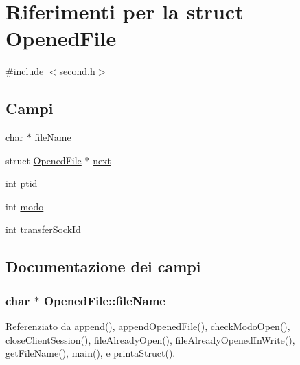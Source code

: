 \hypertarget{structOpenedFile}{}\section{Riferimenti per la struct Opened\+File}
\label{structOpenedFile}


{\ttfamily \#include $<$second.\+h$>$}

\subsection*{Campi}
\begin{DoxyCompactItemize}
\item 
char $\ast$ \hyperlink{structOpenedFile_abcff0610dfa8b1e3836b3f5bac40c8f5}{file\+Name}
\item 
struct \hyperlink{structOpenedFile}{Opened\+File} $\ast$ \hyperlink{structOpenedFile_a9b8c8b995cdda6da249a6ce9a9df98b2}{next}
\item 
int \hyperlink{structOpenedFile_aba1e9ae457adfa6a9cc6a22ca4ee290d}{ptid}
\item 
int \hyperlink{structOpenedFile_a6d9f22ff6ba81506ba9c4a60f27c4f32}{modo}
\item 
int \hyperlink{structOpenedFile_a122a7d3d722dc1f7c63857af2024f098}{transfer\+Sock\+Id}
\end{DoxyCompactItemize}


\subsection{Documentazione dei campi}
\hypertarget{structOpenedFile_abcff0610dfa8b1e3836b3f5bac40c8f5}{}
\subsubsection[{file\+Name}]{\setlength{\rightskip}{0pt plus 5cm}char $\ast$ Opened\+File\+::file\+Name}\label{structOpenedFile_abcff0610dfa8b1e3836b3f5bac40c8f5}


Referenziato da append(), append\+Opened\+File(), check\+Modo\+Open(), close\+Client\+Session(), file\+Already\+Open(), file\+Already\+Opened\+In\+Write(), get\+File\+Name(), main(), e printa\+Struct().

\hypertarget{structOpenedFile_a6d9f22ff6ba81506ba9c4a60f27c4f32}{}
